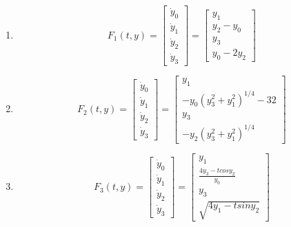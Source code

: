 \begin{exercise}{4}
\begin{enumerate}
    \item $$
        F_1(t,y)=
        \begin{bmatrix}
        \dot y_0\\ \dot y_1\\ \dot y_2 \\ \dot y_3
        \end{bmatrix}
        =
        \begin{bmatrix}
        y_1\\ y_2-y_0 \\ y_3  \\ y_0-2y_2 
        \end{bmatrix}
        $$
    \item $$
        F_2(t,y)=
        \begin{bmatrix}
        \dot y_0\\ \dot y_1\\ \dot y_2 \\ \dot y_3
        \end{bmatrix}
        =
        \begin{bmatrix}
        y_1\\ -y_0(y_3^2+y_1^2)^{1/4}-32 \\ y_3  \\ -y_2(y_3^2+y_1^2)^{1/4}
        \end{bmatrix}
        $$
    \item $$
        F_3(t,y)=
        \begin{bmatrix}
        \dot y_0\\ \dot y_1\\ \dot y_2 \\ \dot y_3
        \end{bmatrix}
        =
        \begin{bmatrix}
        y_1\\ \frac{4y_3-tcosy_2}{y_0} \\ y_3  \\  \sqrt{4y_1-tsiny_2}
        \end{bmatrix}
        $$
\end{enumerate}

\end{exercise}

